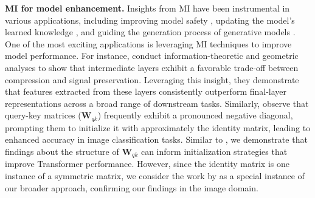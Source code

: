 \textbf{MI for model enhancement.}
%
Insights from MI have been instrumental in various applications, including improving model safety \citep{Belrose_Furman_Smith_Halawi_Ostrovsky_McKinney_Biderman_Steinhardt_2023}, updating the model's learned knowledge \citep{Meng_Bau_Andonian_Belinkov_2022}, and guiding the generation process of generative models \citep{Geva_Caciularu_2022}.
%
One of the most exciting applications is leveraging MI techniques to improve model performance.
For instance, \citet{skean2025layer} conduct information-theoretic and geometric analyses to show that intermediate layers exhibit a favorable trade-off between compression and signal preservation. Leveraging this insight, they demonstrate that features extracted from these layers consistently outperform final-layer representations across a broad range of downstream tasks.
%
Similarly, \citet{trockman_mimetic_2023} observe that query-key matrices ($\bm{W}_{qk}$) frequently exhibit a pronounced negative diagonal, prompting them to initialize it with approximately the identity matrix, leading to enhanced accuracy in image classification tasks.
%
Similar to \citep{trockman_mimetic_2023}, we demonstrate that findings about the structure of $\bm{W}_{qk}$  can inform initialization strategies that improve Transformer performance. However, since the identity matrix is one instance of a symmetric matrix, we consider the work by \citep{trockman_mimetic_2023} as a special instance of our broader approach, confirming our findings in the image domain.